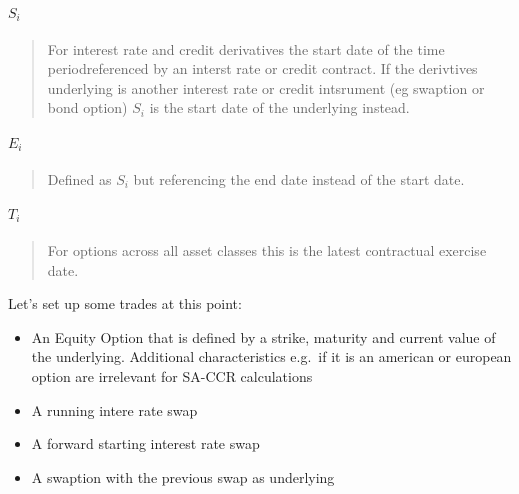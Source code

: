 \documentclass[11pt]{article}
\providecommand{\tightlist}{%
      \setlength{\itemsep}{0pt}\setlength{\parskip}{0pt}}
\begin{document}
\hypertarget{s_i}{%
\paragraph{\texorpdfstring{\(S_i\)}{S\_i}}\label{s_i}}

\begin{quote}
For interest rate and credit derivatives the start date of the time
periodreferenced by an interst rate or credit contract. If the
derivtives underlying is another interest rate or credit intsrument (eg
swaption or bond option) \(S_i\) is the start date of the underlying
instead.
\end{quote}

\hypertarget{e_i}{%
\paragraph{\texorpdfstring{\(E_i\)}{E\_i}}\label{e_i}}

\begin{quote}
Defined as \(S_i\) but referencing the end date instead of the start
date.
\end{quote}

\hypertarget{t_i}{%
\paragraph{\texorpdfstring{\(T_i\)}{T\_i}}\label{t_i}}

\begin{quote}
For options across all asset classes this is the latest contractual
exercise date.
\end{quote}

    Let's set up some trades at this point:

\begin{itemize}
\tightlist
\item
  An Equity Option that is defined by a strike, maturity and current
  value of the underlying. Additional characteristics e.g.~if it is an
  american or european option are irrelevant for SA-CCR calculations
\item
  A running intere rate swap
\item
  A forward starting interest rate swap
\item
  A swaption with the previous swap as underlying
\end{itemize}
\end{document}
